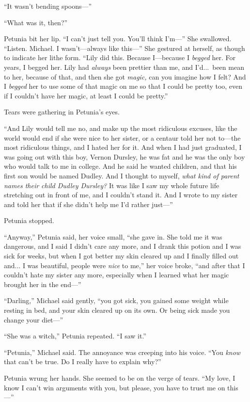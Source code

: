 “It wasn’t bending spoons—”

“What was it, then?”

Petunia bit her lip. “I can’t just tell you. You’ll think I’m—” She swallowed. “Listen. Michael. I wasn’t—always like this—” She gestured at herself, as though to indicate her lithe form. “Lily did this. Because I—because I \emph{begged} her. For years, I begged her. Lily had \emph{always} been prettier than me, and I’d...\ been mean to her, because of that, and then she got \emph{magic,} can you imagine how I felt? And I \emph{begged} her to use some of that magic on me so that I could be pretty too, even if I couldn’t have her magic, at least I could be pretty.”

Tears were gathering in Petunia’s eyes.

“And Lily would tell me no, and make up the most ridiculous excuses, like the world would end if she were nice to her sister, or a centaur told her not to—the most ridiculous things, and I hated her for it. And when I had just graduated, I was going out with this boy, Vernon Dursley, he was fat and he was the only boy who would talk to me in college. And he said he wanted children, and that his first son would be named Dudley. And I thought to myself, \emph{what kind of parent names their child Dudley Dursley?} It was like I saw my whole future life stretching out in front of me, and I couldn’t stand it. And I wrote to my sister and told her that if she didn’t help me I’d rather just—”

Petunia stopped.

“Anyway,” Petunia said, her voice small, “she gave in. She told me it was dangerous, and I said I didn’t care any more, and I drank this potion and I was sick for weeks, but when I got better my skin cleared up and I finally filled out and... I was beautiful, people were \emph{nice} to me,” her voice broke, “and after that I couldn’t hate my sister any more, especially when I learned what her magic brought her in the end—”

“Darling,” Michael said gently, “you got sick, you gained some weight while resting in bed, and your skin cleared up on its own. Or being sick made you change your diet—”

“She was a witch,” Petunia repeated. “I saw it.”

“Petunia,” Michael said. The annoyance was creeping into his voice. “You \emph{know} that can’t be true. Do I really have to explain why?”

Petunia wrung her hands. She seemed to be on the verge of tears. “My love, I know I can’t win arguments with you, but please, you have to trust me on this—”

